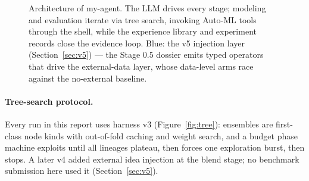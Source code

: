 \documentclass[11pt,a4paper]{article}
\begin{document}
\begin{figure}[htbp]
\caption{Architecture of my-agent. The LLM drives every stage; modeling and evaluation iterate
via tree search, invoking Auto-ML tools through the shell, while the experience library and
experiment records close the evidence loop. Blue: the v5 injection layer
(Section~\ref{sec:v5}) --- the Stage 0.5 dossier emits typed operators that drive the
external-data layer, whose data-level arms race against the no-external baseline.}
\label{fig:arch}
\end{figure}

\paragraph{Tree-search protocol.} Every run in this report uses harness v3 (Figure~\ref{fig:tree}): ensembles are first-class node kinds with out-of-fold caching and weight search, and a budget phase machine exploits until all lineages plateau, then forces one exploration burst, then stops. A later v4 added external idea injection at the blend stage; no benchmark submission here used it (Section~\ref{sec:v5}).
\end{document}
